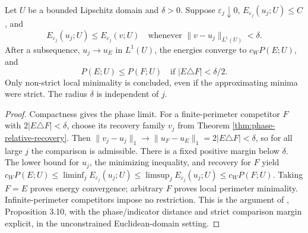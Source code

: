 \begin{proposition}\label{prop:phase-local-minimizers}
Let $U$ be a bounded Lipschitz domain and $\delta>0$. Suppose $\varepsilon_j\downarrow0$, $E_{\varepsilon_j}(u_j;U)\leq C$, and
\[
 E_{\varepsilon_j}(u_j;U)\leq E_{\varepsilon_j}(v;U)
 \quad\text{whenever }\|v-u_j\|_{L^1(U)}<\delta.
\]
After a subsequence, $u_j\to u_E$ in $L^1(U)$, the energies converge to $c_WP(E;U)$, and
\[
 P(E;U)\leq P(F;U)\quad\text{if }|E\triangle F|<\delta/2.
\]
Only non-strict local minimality is concluded, even if the approximating minima were strict. The radius $\delta$ is independent of $j$.
\end{proposition}
\begin{proof}
Compactness gives the phase limit. For a finite-perimeter competitor $F$ with $2|E\triangle F|<\delta$, choose its recovery family $v_j$ from Theorem \ref{thm:phase-relative-recovery}. Then
$\|v_j-u_j\|_1\to\|u_F-u_E\|_1=2|E\triangle F|<\delta$, so for all large $j$ the comparison is admissible. There is a fixed positive margin below $\delta$. The lower bound for $u_j$, the minimizing inequality, and recovery for $F$ yield
$c_WP(E;U)\leq\liminf_jE_{\varepsilon_j}(u_j;U)\leq\limsup_jE_{\varepsilon_j}(u_j;U)\leq c_WP(F;U)$.
Taking $F=E$ proves energy convergence; arbitrary $F$ proves local perimeter minimality. Infinite-perimeter competitors impose no restriction. This is the argument of \cite{ChAC}, Proposition 3.10, with the phase/indicator distance and strict comparison margin explicit, in the unconstrained Euclidean-domain setting.
\end{proof}
